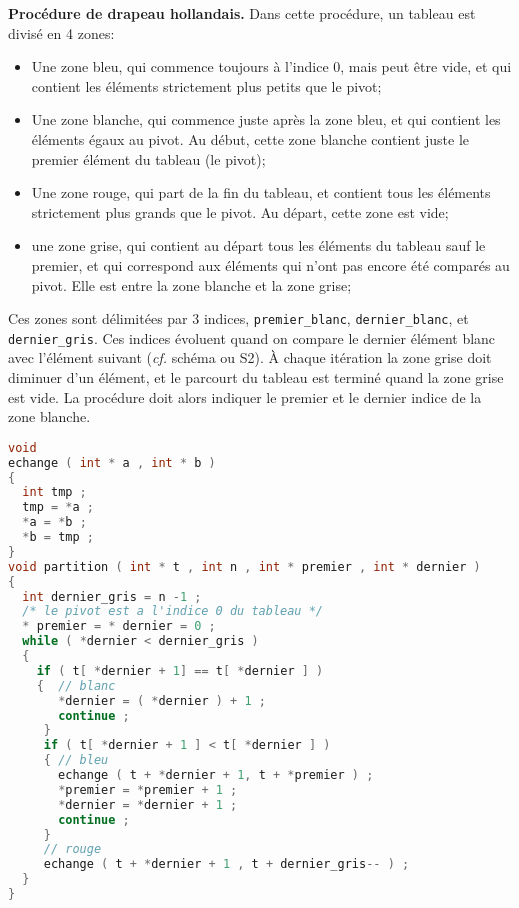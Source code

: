 \question \textbf{Procédure de drapeau hollandais.} Dans cette
procédure, un tableau est divisé en 4 zones:
\begin{itemize}
\item Une zone bleu, qui commence toujours à l'indice 0, mais peut
  être vide, et qui contient les éléments strictement plus petits que
  le pivot;
\item Une zone blanche, qui commence juste après la zone bleu, et qui
  contient les éléments égaux au pivot. Au début, cette zone blanche
  contient juste le premier élément du tableau (le pivot);
\item Une zone rouge, qui part de la fin du tableau, et contient tous
  les éléments strictement plus grands que le pivot. Au départ, cette
  zone est vide;
\item une zone grise, qui contient au départ tous les éléments du
  tableau sauf le premier, et qui correspond aux éléments qui n'ont
  pas encore été comparés au pivot. Elle est entre la zone blanche et
  la zone grise;
\end{itemize}
Ces zones sont délimitées par 3 indices, \texttt{premier\_blanc},
\texttt{dernier\_blanc}, et \texttt{dernier\_gris}.  Ces indices
évoluent quand on compare le dernier élément blanc avec l'élément
suivant (\textit{cf.} schéma ou S2). À chaque itération la zone grise
doit diminuer d'un élément, et le parcourt du tableau est terminé
quand la zone grise est vide. La procédure doit alors indiquer le
premier et le dernier indice de la zone blanche.

\begin{solution}
  \begin{lstlisting}[language=C]
void
echange ( int * a , int * b )
{
  int tmp ;
  tmp = *a ;
  *a = *b ;
  *b = tmp ;
}
void partition ( int * t , int n , int * premier , int * dernier )
{
  int dernier_gris = n -1 ;
  /* le pivot est a l'indice 0 du tableau */
  * premier = * dernier = 0 ;
  while ( *dernier < dernier_gris )
  {
    if ( t[ *dernier + 1] == t[ *dernier ] )
    {  // blanc
       *dernier = ( *dernier ) + 1 ;
       continue ;
     }
     if ( t[ *dernier + 1 ] < t[ *dernier ] )
     { // bleu
       echange ( t + *dernier + 1, t + *premier ) ;
       *premier = *premier + 1 ;
       *dernier = *dernier + 1 ;
       continue ;
     }
     // rouge
     echange ( t + *dernier + 1 , t + dernier_gris-- ) ;
  }
}    
  \end{lstlisting}
\end{solution}


